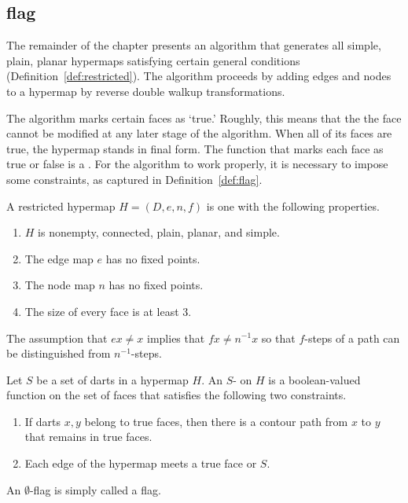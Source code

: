 \subsection{flag}
%

The remainder of the chapter presents an algorithm that generates all
simple, plain, planar hypermaps satisfying certain general conditions
(Definition~\ref{def:restricted}).  The algorithm proceeds by adding
edges and nodes to a hypermap by reverse double walkup
transformations.

The algorithm  marks certain faces as `true.'
Roughly, this  means that the the face cannot be modified
at any later stage of the algorithm.   When all of its faces
are true, the hypermap stands in final form.
The function that marks each face as true or false is a
.  For the algorithm to work properly, it is necessary
to impose some constraints, as captured in Definition~\ref{def:flag}.
%

\begin{definition}[restricted]\label{def:restricted}
A restricted hypermap $H = (D,e,n,f)$ is one with the following
properties.
\begin{enumerate}
\item $H$ is nonempty, connected, plain, planar, and simple.
\item The edge map $e$ has no fixed points.  %
\item The node map $n$ has no fixed points.
\item The size of every face is at least $3$.
\end{enumerate}
%
%
\end{definition}

\begin{remark}
The assumption that $e x \ne x$ implies that $f x \ne n^{-1} x$ so that $f$-steps of a 
path can be distinguished from $n^{-1}$-steps.
\end{remark}

\begin{definition}[flag]\label{def:flag} 
Let $S$ be a set of darts in a hypermap $H$.  An
$S$- on $H$ is a boolean-valued function on the set of faces that satisfies
the following two constraints. 
\begin{enumerate}
\item If darts $x,y$ belong to true faces,
then there is a contour path from $x$ to $y$ that remains
in true faces.
\item Each edge of the hypermap meets a true face or $S$.
\end{enumerate}
An $\emptyset$-flag is simply called a flag.
%
%
\end{definition}



